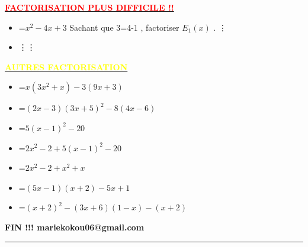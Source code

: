 \documentclass[a4paper,12pt]{article}
\begin{document}
\begin{center}
\begin{itemize}
			
		\end{itemize} 
		\vspace{1pt} 
		\textbf{\underline{\textcolor{red}{FACTORISATION PLUS DIFFICILE  !! }}} \\ 
		
		\begin{itemize}
			\item [$E_1(x)$]=$x^2-4x+3$ Sachant que 3=4-1 , factoriser $E_1(x)$ . 
			\vdots
			\item \vdots \vdots
			
		\end{itemize} 
		\vspace{2pt}
		\textbf{\underline{\textcolor{yellow}{AUTRES FACTORISATION}}} \\ 
		
		\begin{itemize}
			\item [$F_1(x)$]=$x(3x^2+x)-3(9x+3)$
			\item [$F_2(x)$]=$(2x-3)(3x+5)^2-8(4x-6)$
			\item [$F_3(x)$]=$5(x-1)^2-20$
			\item [$F_4(x)$]=$2x^2-2+5(x-1)^2-20$
			\item [$F_5(x)$]=$2x^2-2+x^2+x$
			\item [$F_6(x)$]=$(5x-1)(x+2)-5x+1$
			\item [$F_7(x)$]=$(x+2)^2-(3x+6)(1-x)-(x+2)$
			
			
			
		\end{itemize}  
		
		
		 \vspace{3cm}  
		 
		  \textbf{FIN !!! \hfill mariekokou06@gmail.com }
		 
		 
		 \hrule  
		
		
		
		
		
		
		
		
		
	\end{center}
	
	
	
	
	
	
	
	
	
	
	
	
	
	
	
	
	
\end{document}
